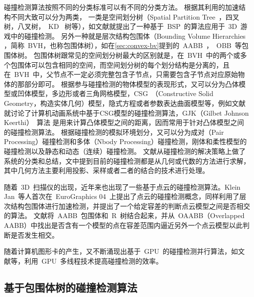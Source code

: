 碰撞检测算法按照不同的分类标准可以有不同的分类方法。
根据其利用的加速结构不同大致可以分为两类，
一类是空间划分树（Spatial Partition Tree~，四叉树，八叉树，~KD~
树等），如文献就提出了一种基于~BSP~的算法应用于~3D~游戏中的碰撞检测。
另外一种就是层次结构包围体（Bounding Volume Hierarchies
，简称~BVH，也称包围体树），如在\ref{sec:convex-bv}提到的~AABB~，~OBB~等包围体树。
包围体树跟常见的空间划分树最大的区别就是，在~BVH~中的两个或多个包围体可以包含相同的空间，而空间划分树的每个划分结构是分离的，且在~BVH~中，父节点不一定必须完整包含子节点，只需要包含子节点对应原始物体的那部分即可\cite{ericson2005real}。 
根据参与碰撞检测的物体模型的表现形式，又可以分为凸体模型或凹体模型，多边形或者三角网格模型，CSG~（Constructive
Solid Geometry，构造实体几何）模型，隐式方程或者参数表达曲面模型等，例如文献就讨论了计算机动画系统中基于CSG模型的碰撞检测算法，GJK（Gilbet Johnson Keerthi）~算法\cite{gilbert1988fast,bergen1999fast}
是用来计算凸体模型之间的距离，因而常用于针对凸体模型之间的碰撞检测算法。
根据碰撞检测的模拟环境划分，又可以分为成对（Pair Processing）碰撞检测和多体（Nbody Processing）碰撞检测，刚体和柔性模型的碰撞检测以及静态和动态（连续）碰撞检测\cite{lin1998collision}。
文献从碰撞检测的解决策略上做了系统的分类和总结，文中提到目前的碰撞检测都是从几何或代数的方法进行求解，其中几何方法主要利用投影、采样或者二者的结合的技术进行处理。

随着~3D~扫描仪的出现，近年来也出现了一些基于点云的碰撞检测算法。Klein Jan~等人\cite{klein2004point}首次在~EuroGraphics 04~上提出了点云的碰撞检测概念，同样利用了层次结构包围体进行加速检测，并提出了一个给定容差的判断点云模型之间是否相交的算法。
文献\cite{figueiredo2010efficient}将~AABB~包围体和~R~树结合起来，并从~OAABB（Overlapped AABB）中找出是否含有一个模型的点在容差范围内逼近另外一个点云模型以此判断是否发生相交。

随着计算机图形卡的产生，又不断涌现出基于~GPU~的碰撞检测并行算法，如文献等，利用~GPU~多线程技术提高碰撞检测的效率。

\subsection{基于包围体树的碰撞检测算法}
\label{sec:cd-bvh}

